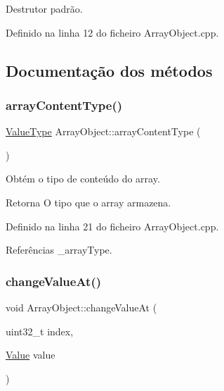 Destrutor padrão. 



Definido na linha 12 do ficheiro Array\+Object.\+cpp.



\subsection{Documentação dos métodos}
\mbox{\label{classArrayObject_a389af37c0ab94e2c84985ab1698ce679}} 
\subsubsection{\texorpdfstring{array\+Content\+Type()}{arrayContentType()}}
{\footnotesize\ttfamily \hyperlink{BasicTypes_8h_ad9971b6ef33e02ba2c75d19c1d2518a1}{Value\+Type} Array\+Object\+::array\+Content\+Type (\begin{DoxyParamCaption}{ }\end{DoxyParamCaption})}



Obtém o tipo de conteúdo do array. 

\begin{DoxyReturn}{Retorna}
O tipo que o array armazena. 
\end{DoxyReturn}


Definido na linha 21 do ficheiro Array\+Object.\+cpp.



Referências \+\_\+array\+Type.

\mbox{\label{classArrayObject_a20e1735b3bc9db6c9bd219d70355f160}} 
\subsubsection{\texorpdfstring{change\+Value\+At()}{changeValueAt()}}
{\footnotesize\ttfamily void Array\+Object\+::change\+Value\+At (\begin{DoxyParamCaption}\item[{uint32\+\_\+t}]{index,  }\item[{\hyperlink{structValue}{Value}}]{value }\end{DoxyParamCaption})}



